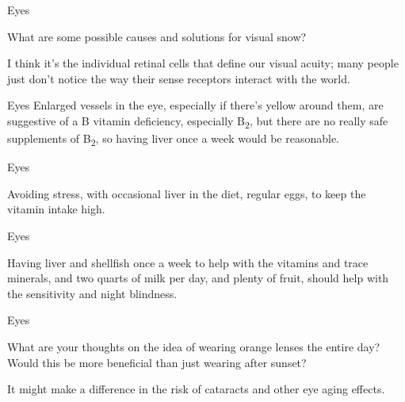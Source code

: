 \documentclass[11pt,oneside,openany,extrafontsizes]{memoir}
\begin{document}
\begin{qaexchange}{Eyes}

    \begin{question}
        What are some possible causes and solutions for visual snow?
    \end{question}

    \begin{answer}
        I think it's the individual retinal cells that define our visual acuity; many people just don't notice the way their sense receptors interact with the world.
    \end{answer}
\end{qaexchange}

\begin{standalonequote}{Eyes}
      Enlarged vessels in the eye, especially if there's yellow around them, are suggestive of a B vitamin deficiency, especially B\textsubscript{2}, but there are no really safe supplements of B\textsubscript{2}, so having liver once a week would be reasonable.
    \begin{answer}
      
    \end{answer}
\end{standalonequote}

\begin{standalonequote}{Eyes}

    \begin{answer}
      Avoiding stress, with occasional liver in the diet, regular eggs, to keep the vitamin intake high.
    \end{answer}
\end{standalonequote}

\begin{standalonequote}{Eyes}

    \begin{answer}
       Having liver and shellfish once a week to help with the vitamins and trace minerals, and two quarts of milk per day, and plenty of fruit, should help with the sensitivity and night blindness.
    \end{answer}
\end{standalonequote}

\begin{qaexchange}{Eyes}

    \begin{question}
        What are your thoughts on the idea of wearing orange lenses the entire day? Would this be more beneficial than just wearing after sunset?
    \end{question}

    \begin{answer}
       It might make a difference in the risk of cataracts and other eye aging effects.
    \end{answer}
\end{qaexchange}
\end{document}
